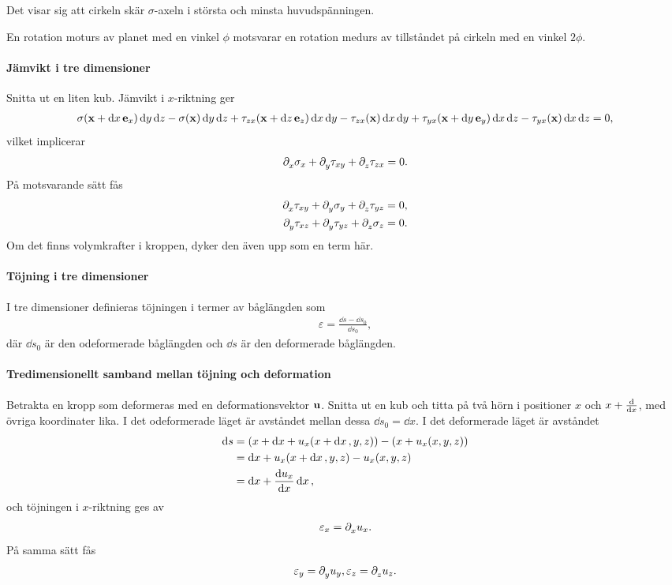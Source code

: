 Det visar sig att cirkeln skär $\sigma$-axeln i största och minsta huvudspänningen.

En rotation moturs av planet med en vinkel $\phi$ motsvarar en rotation medurs av tillståndet på cirkeln med en vinkel $2\phi$.

\paragraph{Jämvikt i tre dimensioner}
Snitta ut en liten kub. Jämvikt i $x$-riktning ger
\begin{align*}
	\sigma(\vb{x} + \dd{x}\vb{e}_{x})\dd{y}\dd{z} - \sigma(\vb{x})\dd{y}\dd{z} + \tau_{zx}(\vb{x} + \dd{z}\vb{e}_{z})\dd{x}\dd{y} - \tau_{zx}(\vb{x})\dd{x}\dd{y} + \tau_{yx}(\vb{x} + \dd{y}\vb{e}_{y})\dd{x}\dd{z} - \tau_{yx}(\vb{x})\dd{x}\dd{z} = 0,
\end{align*}
vilket implicerar
\begin{align*}
	\partial_{x}^{}\sigma_{x} + \partial_{y}^{}\tau_{xy} + \partial_{z}^{}\tau_{zx} = 0.
\end{align*}
På motsvarande sätt fås
\begin{align*}
	\partial_{x}^{}\tau_{xy} + \partial_{y}^{}\sigma_{y} + \partial_{z}^{}\tau_{yz} &= 0, \\
	\partial_{y}^{}\tau_{xz} + \partial_{y}^{}\tau_{yz} + \partial_{z}^{}\sigma_{z} &= 0.
\end{align*}
Om det finns volymkrafter i kroppen, dyker den även upp som en term här.

\paragraph{Töjning i tre dimensioner}
I tre dimensioner definieras töjningen i termer av båglängden som
\begin{align*}
	\varepsilon = \frac{\dd{s} - \dd{s_{0}}}{\dd{s_{0}}},
\end{align*}
där $\dd{s_{0}}$ är den odeformerade båglängden och $\dd{s}$ är den deformerade båglängden.

\paragraph{Tredimensionellt samband mellan töjning och deformation}
Betrakta en kropp som deformeras med en deformationsvektor $\vb{u}$. Snitta ut en kub och titta på två hörn i positioner $x$ och $x + \dv{x}$, med övriga koordinater lika. I det odeformerade läget är avståndet mellan dessa $\dd{s_{0}} = \dd{x}$. I det deformerade läget är avståndet
\begin{align*}
	\dd{s} &= (x + \dd{x} + u_{x}(x + \dd{x}, y, z)) - (x + u_{x}(x, y, z)) \\
	       &= \dd{x} + u_{x}(x + \dd{x}, y, z) - u_{x}(x, y, z) \\
	       &= \dd{x} + \dv{u_{x}}{x}\dd{x},
\end{align*}
och töjningen i $x$-riktning ges av
\begin{align*}
	\varepsilon_{x} = \partial_{x}^{}u_{x}.
\end{align*}
På samma sätt fås
\begin{align*}
	\varepsilon_{y} = \partial_{y}^{}u_{y}, \varepsilon_{z} = \partial_{z}^{}u_{z}.
\end{align*}

